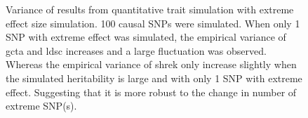 \begin{figure}
{				
				\label{fig:ldscInQtEx100cVar}
			}
			\caption[Variance of Extreme Effect Size Simulation Result]
			{Variance of results from quantitative trait simulation with extreme effect size simulation.
				100 causal \glspl{SNP} were simulated.
				When only 1 \gls{SNP} with extreme effect was simulated, the empirical variance of \gls{gcta} and \gls{ldsc} increases and a large fluctuation was observed.
				Whereas the empirical variance of \gls{shrek} only increase slightly when the simulated heritability is large and with only 1 \gls{SNP} with extreme effect.
				Suggesting that it is more robust to the change in number of extreme \gls{SNP}(s).
			} 
			\label{fig:QtEx100cVar}
		\end{figure}
		
